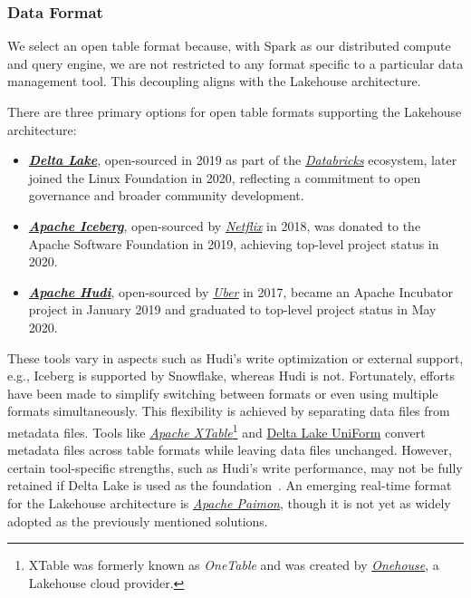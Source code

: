 \subsubsection{Data Format}
\label{sec:design-decisions-data-format}

We select an open table format because, with Spark as our distributed compute and query engine, we are not restricted to any format specific to a particular data management tool.
This decoupling aligns with the Lakehouse architecture.

There are three primary options for open table formats supporting the Lakehouse architecture:

\begin{itemize}
    \item \href{https://delta.io/}{\textit{\textbf{Delta Lake}}}, open-sourced in 2019 as part of the \href{https://www.databricks.com/}{\textit{Databricks}} ecosystem, later joined the Linux Foundation in 2020, reflecting a commitment to open governance and broader community development.
    \item \href{https://iceberg.apache.org/}{\textit{\textbf{Apache Iceberg}}}, open-sourced by \href{https://www.netflix.com/}{\textit{Netflix}} in 2018, was donated to the Apache Software Foundation in 2019, achieving top-level project status in 2020.
    \item \href{https://hudi.apache.org/}{\textit{\textbf{Apache Hudi}}}, open-sourced by \href{https://www.uber.com/}{\textit{Uber}} in 2017, became an Apache Incubator project in January 2019 and graduated to top-level project status in May 2020.
\end{itemize}

These tools vary in aspects such as Hudi's write optimization or external support, e.g., Iceberg is supported by Snowflake, whereas Hudi is not.
Fortunately, efforts have been made to simplify switching between formats or even using multiple formats simultaneously.
This flexibility is achieved by separating data files from metadata files.
Tools like \href{https://xtable.incubator.apache.org/}{\textit{Apache XTable}}\footnote{XTable was formerly known as \textit{OneTable} and was created by \href{https://www.onehouse.ai/}{\textit{Onehouse}}, a Lakehouse cloud provider.} and \href{https://www.databricks.com/product/delta-lake-on-databricks}{Delta Lake UniForm} convert metadata files across table formats while leaving data files unchanged.
However, certain tool-specific strengths, such as Hudi's write performance, may not be fully retained if Delta Lake is used as the foundation~\cite{Merced2024}.
An emerging real-time format for the Lakehouse architecture is \href{https://paimon.apache.org/}{\textit{Apache Paimon}}, though it is not yet as widely adopted as the previously mentioned solutions.

